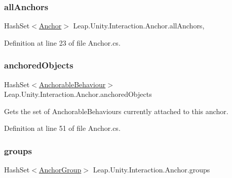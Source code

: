 \subsubsection{\texorpdfstring{allAnchors}{allAnchors}}
{\footnotesize\ttfamily Hash\+Set$<$\mbox{\hyperlink{class_leap_1_1_unity_1_1_interaction_1_1_anchor}{Anchor}}$>$ Leap.\+Unity.\+Interaction.\+Anchor.\+all\+Anchors\hspace{0.3cm}{\ttfamily [static]}, {\ttfamily [get]}}



Definition at line 23 of file Anchor.\+cs.

\mbox{\label{class_leap_1_1_unity_1_1_interaction_1_1_anchor_a33e0bc00ec1ff195fac8f709abe72cbc}} 
\subsubsection{\texorpdfstring{anchoredObjects}{anchoredObjects}}
{\footnotesize\ttfamily Hash\+Set$<$\mbox{\hyperlink{class_leap_1_1_unity_1_1_interaction_1_1_anchorable_behaviour}{Anchorable\+Behaviour}}$>$ Leap.\+Unity.\+Interaction.\+Anchor.\+anchored\+Objects\hspace{0.3cm}{\ttfamily [get]}}



Gets the set of Anchorable\+Behaviours currently attached to this anchor. 



Definition at line 51 of file Anchor.\+cs.

\mbox{\label{class_leap_1_1_unity_1_1_interaction_1_1_anchor_a4f233c6361e5c63d04fd58abb1a9e1f6}} 
\subsubsection{\texorpdfstring{groups}{groups}}
{\footnotesize\ttfamily Hash\+Set$<$\mbox{\hyperlink{class_leap_1_1_unity_1_1_interaction_1_1_anchor_group}{Anchor\+Group}}$>$ Leap.\+Unity.\+Interaction.\+Anchor.\+groups\hspace{0.3cm}{\ttfamily [get]}}



